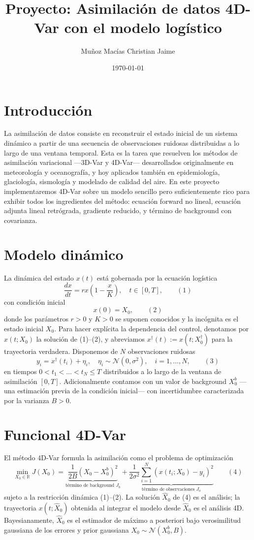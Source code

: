 \documentclass[12pt,spanish,mexico]{article}
\title{Proyecto: Asimilación de datos 4D-Var con el modelo logístico}
\author{Muñoz Macías Christian Jaime}
\date{\today}
\numberwithin{equation}{section}
\theoremstyle{definition}
\theoremstyle{remark}
\begin{document}
\maketitle

\section*{Introducción}
La asimilación de datos consiste en reconstruir el estado inicial de un sistema dinámico a partir de una secuencia de observaciones ruidosas distribuidas a lo largo de una ventana temporal. Esta es la tarea que resuelven los métodos de asimilación variacional —3D-Var y 4D-Var— desarrollados originalmente en meteorología y oceanografía, y hoy aplicados también en epidemiología, glaciología, sismología y modelado de calidad del aire. En este proyecto implementaremos 4D-Var sobre un modelo sencillo pero suficientemente rico para exhibir todos los ingredientes del método: ecuación forward no lineal, ecuación adjunta lineal retrógrada, gradiente reducido, y término de background con covarianza.

\section{Modelo dinámico}
La dinámica del estado \(x(t)\) está gobernada por la ecuación logística
\[
\frac{dx}{dt} = r x \left(1 - \frac{x}{K}\right), \quad t \in [0, T], \qquad (1)
\]
con condición inicial
\[
x(0) = X_0, \qquad (2)
\]
donde los parámetros \(r > 0\) y \(K > 0\) se suponen conocidos y la incógnita es el estado inicial \(X_0\). Para hacer explícita la dependencia del control, denotamos por \(x(t; X_0)\) la solución de (1)–(2), y abreviamos \(x^\dagger(t) := x(t; X_0^\dagger)\) para la trayectoria verdadera. Disponemos de \(N\) observaciones ruidosas
\[
y_i = x^\dagger(t_i) + \eta_i, \quad \eta_i \sim \mathcal{N}(0, \sigma^2), \quad i = 1, \dots, N, \qquad (3)
\]
en tiempos \(0 < t_1 < \dots < t_N \leq T\) distribuidos a lo largo de la ventana de asimilación \([0, T]\). Adicionalmente contamos con un valor de background \(X_0^b\) —una estimación previa de la condición inicial— con incertidumbre caracterizada por la varianza \(B > 0\).

\section{Funcional 4D-Var}
El método 4D-Var formula la asimilación como el problema de optimización
\[
\min_{X_0 \in \mathbb{R}} J(X_0) = \underbrace{\frac{1}{2B}(X_0 - X_0^b)^2}_{\text{término de background } J_b} + \underbrace{\frac{1}{2\sigma^2} \sum_{i=1}^N (x(t_i; X_0) - y_i)^2}_{\text{término de observaciones } J_o} \qquad (4)
\]
sujeto a la restricción dinámica (1)–(2). La solución \(\hat{X}_0\) de (4) es el análisis; la trayectoria \(x(t; \hat{X}_0)\) obtenida al integrar el modelo desde \(\hat{X}_0\) es el análisis 4D. Bayesianamente, \(\hat{X}_0\) es el estimador de máximo a posteriori bajo verosimilitud gaussiana de los errores y prior gaussiana \(X_0 \sim \mathcal{N}(X_0^b, B)\).
\end{document}
